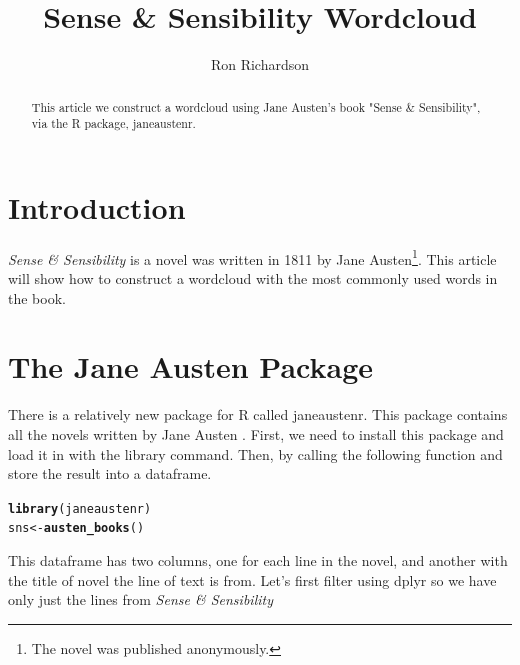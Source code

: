 \documentclass{article}\usepackage[]{graphicx}\usepackage[]{color}
\makeatletter
\newcommand{\hlstd}[1]{\textcolor[rgb]{0.345,0.345,0.345}{#1}}%
\newcommand{\hlkwb}[1]{\textcolor[rgb]{0.69,0.353,0.396}{#1}}%
\newcommand{\hlkwd}[1]{\textcolor[rgb]{0.737,0.353,0.396}{\textbf{#1}}}%
\newenvironment{kframe}{%
 \def\at@end@of@kframe{}%
 \ifinner\ifhmode%
  \def\at@end@of@kframe{\end{minipage}}%
  \begin{minipage}{\columnwidth}%
 \fi\fi%
 \def\FrameCommand##1{\hskip\@totalleftmargin \hskip-\fboxsep
 \colorbox{shadecolor}{##1}\hskip-\fboxsep
     \hskip-\linewidth \hskip-\@totalleftmargin \hskip\columnwidth}%
 \MakeFramed {\advance\hsize-\width
   \@totalleftmargin\z@ \linewidth\hsize
   \@setminipage}}%
 {\par\unskip\endMakeFramed%
 \at@end@of@kframe}
\newenvironment{knitrout}{}{} %
\makeatother
\begin{document}
\title{Sense \& Sensibility Wordcloud}
\author{Ron Richardson}
\maketitle

\begin{abstract}
This article we construct a wordcloud using Jane Austen's book "Sense \& Sensibility", via the R package, janeaustenr.
\end{abstract}

\section{Introduction}
\textit{Sense \& Sensibility} is a novel was written in 1811 by Jane Austen\footnote{The novel was published anonymously.}. This article will show how to construct a wordcloud with the most commonly used words in the book.

\section{The Jane Austen Package}
There is a relatively new package for R called janeaustenr. This package contains all the novels written by Jane Austen \citep{Silge}. First, we need to install this package and load it in with the library command. Then, by calling the following function and store the result into a dataframe.

\begin{knitrout}
\color{fgcolor}\begin{kframe}
\begin{alltt}
\hlkwd{library}\hlstd{(janeaustenr)}
\hlstd{sns}\hlkwb{<-}\hlkwd{austen_books}\hlstd{()}
\end{alltt}
\end{kframe}
\end{knitrout}

\noindent This dataframe has two columns, one for each line in the novel, and another with the title of novel the line of text is from. Let's first filter using dplyr so we have only just the lines from \textit{Sense \& Sensibility}
\end{document}
